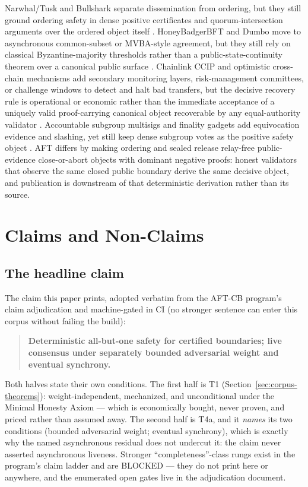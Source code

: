 \documentclass[11pt]{article}
\newcommand{\AFT}{\textsc{AFT}}
\begin{document}
Narwhal/Tusk and Bullshark separate dissemination from ordering, but they still
ground ordering safety in dense positive certificates and quorum-intersection
arguments over the ordered object itself \cite{narwhal,bullshark}. HoneyBadgerBFT
and Dumbo move to asynchronous common-subset or MVBA-style agreement, but they
still rely on classical Byzantine-majority thresholds rather than a
public-state-continuity theorem over a canonical public surface
\cite{honeybadger,dumbo}. Chainlink CCIP and optimistic cross-chain mechanisms
add secondary monitoring layers, risk-management committees, or challenge
windows to detect and halt bad transfers, but the decisive recovery rule is
operational or economic rather than the immediate acceptance of a uniquely valid
proof-carrying canonical object recoverable by any equal-authority validator
\cite{ccip}. Accountable subgroup multisigs and finality gadgets add
equivocation evidence and slashing, yet still keep dense subgroup votes as the
positive safety object \cite{grandpa,accountable}. \AFT{} differs by making
ordering and sealed release relay-free public-evidence close-or-abort objects
with dominant negative proofs: honest validators that observe the same closed
public boundary derive the same decisive object, and publication is downstream
of that deterministic derivation rather than its source.

\section{Claims and Non-Claims}
\label{sec:claims}

\subsection{The headline claim}

The claim this paper prints, adopted verbatim from the AFT-CB program's
claim adjudication and machine-gated in CI (no stronger sentence can enter
this corpus without failing the build):

\begin{quote}
\textbf{Deterministic all-but-one safety for certified boundaries; live
consensus under separately bounded adversarial weight and eventual
synchrony.}
\end{quote}

Both halves state their own conditions. The first half is T1
(Section~\ref{sec:corpus-theorems}): weight-independent, mechanized, and
unconditional under the Minimal Honesty Axiom --- which is economically
bought, never proven, and priced rather than assumed away. The second
half is T4a, and it \emph{names} its two conditions (bounded adversarial
weight; eventual synchrony), which is exactly why the named asynchronous
residual does not undercut it: the claim never asserted asynchronous
liveness. Stronger ``completeness''-class rungs exist in the program's
claim ladder and are BLOCKED --- they do not print here or anywhere,
and the enumerated open gates live in the adjudication document.
\end{document}
